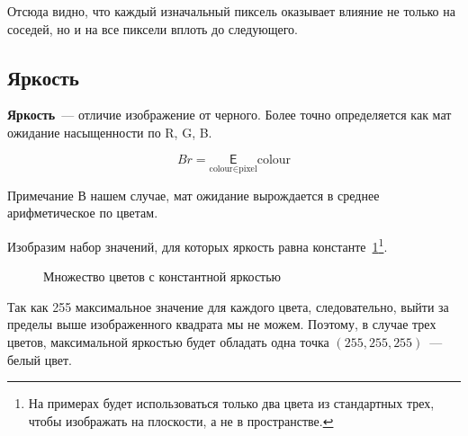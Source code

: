Отсюда видно, что каждый изначальный пиксель оказывает влияние не только на соседей, но и на все пиксели вплоть до следующего.

\subsection{Яркость}

\textbf{Яркость}~--- отличие изображение от черного. Более точно определяется как мат ожидание насыщенности по R, G, B.

$$Br = {\underset{\text{colour} \in \text{pixel}}{\mathsf{E}} \text{colour}}$$

\begin{callout}{Примечание}
    В нашем случае, мат ожидание вырождается в среднее арифметическое по цветам.
\end{callout}

Изобразим набор значений, для которых яркость равна константе~\ref{fig:constbr}\footnote{На примерах будет использоваться только два цвета из стандартных трех, чтобы изображать на плоскости, а не в пространстве.}.

\begin{figure}[h!]
    \centering
    \caption{Множество цветов с константной яркостью}
    \label{fig:constbr}
\end{figure}

Так как 255 максимальное значение для каждого цвета, следовательно, выйти за пределы выше изображенного квадрата мы не можем. Поэтому, в случае трех цветов, максимальной яркостью будет обладать одна точка $(255, 255, 255)$~--- белый цвет.

